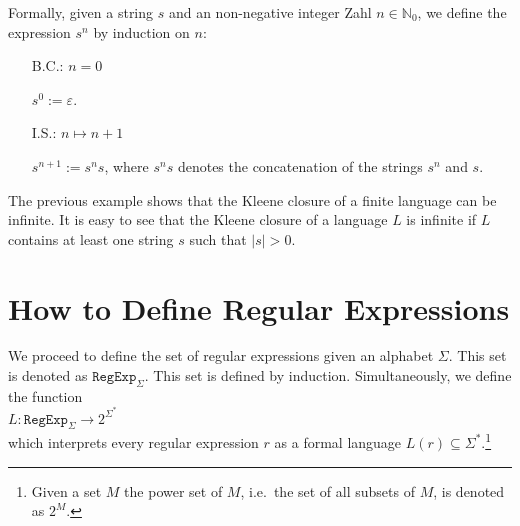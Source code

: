 Formally, given a string $s$ and an non-negative integer Zahl $n \in \mathbb{N}_0$, we define the expression
 $s^n$ by induction on  $n$:
\begin{enumerate}
\item[B.C.:] $n = 0$

             $s^0 := \varepsilon$. 
\item[I.S.:] $n \mapsto n + 1$

             $s^{n+1} := s^n s$, \quad where $s^n s$ denotes the concatenation of the strings $s^n$ and $s$.
             \eox
\end{enumerate}

The previous example shows that the Kleene closure of a finite language can be infinite.
It is easy to see that the Kleene closure of a language $L$ is infinite
if $L$ contains at least one string $s$ such that $|s| > 0$.
\vspace*{0.3cm}

\section{How to Define Regular Expressions}
We proceed to define the set of regular expressions given an  alphabet $\Sigma$.  This set is
denoted as $\texttt{RegExp}_\Sigma$.  This set is defined by induction.  Simultaneously,  we define
the function
\\[0.2cm]
\hspace*{1.3cm}
$L: \texttt{RegExp}_\Sigma \rightarrow 2^{\Sigma^*}$
\\[0.2cm]
which interprets every regular expression  $r$ as a formal language $L(r) \subseteq \Sigma^*$.\footnote{
  Given a set $M$ the power set of $M$, i.e.~the set of all subsets of $M$, is denoted as $2^M$.
}

